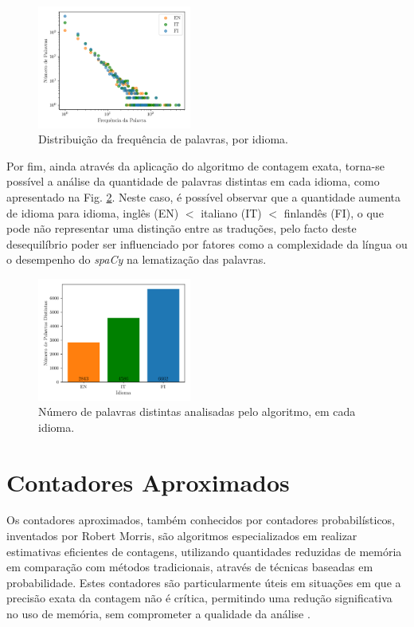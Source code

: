 \documentclass[mirror, portugues]{revdetua}
\begin{document}
\begin{figure}[H]
    \centering
    \includegraphics[width=0.45\textwidth]{../assets/exact_word_freqs.png}
    \caption{Distribuição da frequência de palavras, por idioma.}
    \label{fig:word_freqs}
\end{figure}

Por fim, ainda através da aplicação do algoritmo de contagem exata, torna-se possível a análise da quantidade de palavras distintas em cada idioma, como apresentado na Fig. \ref{fig:distinc_words}. Neste caso, é possível observar que a quantidade aumenta de idioma para idioma, inglês (EN) $<$ italiano (IT) $<$ finlandês (FI), o que pode não representar uma distinção entre as traduções, pelo facto deste desequilíbrio poder ser influenciado por fatores como a complexidade da língua ou o desempenho do \textit{spaCy} na lematização das palavras.

\begin{figure}[H]
    \centering
    \includegraphics[width=0.45\textwidth]{../assets/exact_distinct_words.png}
    \caption{Número de palavras distintas analisadas pelo algoritmo, em cada idioma.}
    \label{fig:distinc_words}
\end{figure}

\section{Contadores Aproximados}

Os contadores aproximados, também conhecidos por contadores probabilísticos, inventados por Robert Morris, são algoritmos especializados em realizar estimativas eficientes de contagens, utilizando quantidades reduzidas de memória em comparação com métodos tradicionais, através de técnicas baseadas em probabilidade. Estes contadores são particularmente úteis em situações em que a precisão exata da contagem não é crítica, permitindo uma redução significativa no uso de memória, sem comprometer a qualidade da análise \cite{RM78}.
\end{document}
